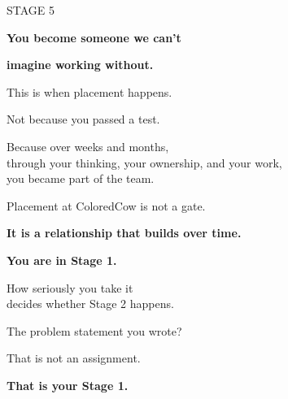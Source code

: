 \documentclass[aspectratio=169]{beamer}
\begin{document}
\begin{frame}{}
\vfill
\begin{center}
{\color{stage}\fontsize{18}{22}\selectfont STAGE 5\par}
\vspace{8pt}
{\fontsize{24}{30}\selectfont\bfseries You become someone we can't\par}
\vspace{2pt}
{\fontsize{24}{30}\selectfont\bfseries imagine working without.\par}
\vspace{18pt}
\begin{minipage}{0.80\textwidth}
{\color{accent}\large This is when placement happens.\par}
\vspace{10pt}
{\color{darktext}Not because you passed a test.\par}
\vspace{6pt}
{\color{darktext}Because over weeks and months,\\through your thinking, your ownership, and your work,\\you became part of the team.\par}
\vspace{12pt}
{\color{dimtext}Placement at ColoredCow is not a gate.\par}
\vspace{4pt}
{\color{accent}\bfseries It is a relationship that builds over time.\par}
\end{minipage}
\end{center}
\vfill
\end{frame}

\begin{frame}{}
\vfill
\begin{center}
{\fontsize{30}{36}\selectfont\bfseries You are in Stage 1.\par}
\vspace{30pt}
{\large\color{darktext}How seriously you take it\\decides whether Stage 2 happens.\par}
\vspace{30pt}
{\color{dimtext}The problem statement you wrote?\par}
\vspace{4pt}
{\color{dimtext}That is not an assignment.\par}
\vspace{12pt}
{\color{accent}\fontsize{22}{28}\selectfont\bfseries That is your Stage 1.\par}
\end{center}
\vfill
\end{frame}
\end{document}
